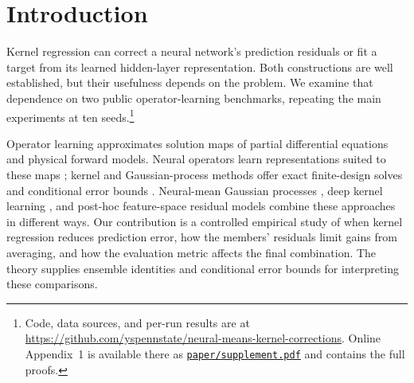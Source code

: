 \documentclass[twoside,11pt]{article}
\begin{document}
\section{Introduction}
\label{sec:intro}
Kernel regression can correct a neural network's prediction residuals or fit a target from its learned hidden-layer representation. Both constructions are well established, but their usefulness depends on the problem. We examine that dependence on two public operator-learning benchmarks, repeating the main experiments at ten seeds.\footnote{Code, data sources, and per-run results are at \url{https://github.com/yspennstate/neural-means-kernel-corrections}. Online Appendix~1 is available there as \href{https://github.com/yspennstate/neural-means-kernel-corrections/blob/main/paper/supplement.pdf}{\texttt{paper/supplement.pdf}} and contains the full proofs.}

Operator learning approximates solution maps of partial differential equations and physical forward models. Neural operators learn representations suited to these maps \citep{kovachki2023neural,lu2021deeponet,li2021fourier}; kernel and Gaussian-process methods offer exact finite-design solves and conditional error bounds \citep{batlle2024kernel,mora2025operator,owhadi2019operator}. Neural-mean Gaussian processes \citep{mora2025operator}, deep kernel learning \citep{wilson2016deep,calandra2016manifold}, and post-hoc feature-space residual models \citep{vendrell2026geometry} combine these approaches in different ways. Our contribution is a controlled empirical study of when kernel regression reduces prediction error, how the members' residuals limit gains from averaging, and how the evaluation metric affects the final combination. The theory supplies ensemble identities and conditional error bounds for interpreting these comparisons.
\end{document}
